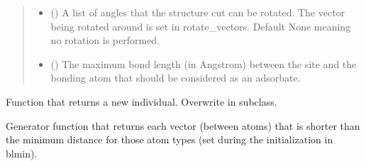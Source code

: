 \documentclass[letterpaper,10pt,english]{sphinxmanual}
\begin{document}
\begin{fulllineitems}
\begin{quote}
\begin{description}
\begin{itemize}
\item {} 
 (\sphinxstyleliteralemphasis{\sphinxupquote{, }}) \textendash{} A list of angles that the structure cut can be rotated. The
vector being rotated around is set in rotate\_vectors. Default
None meaning no rotation is performed.

\item {} 
 (\sphinxstyleliteralemphasis{\sphinxupquote{, }}) \textendash{} The maximum bond length (in Angstrom) between the site and the
bonding atom  that should be considered as an adsorbate.

\end{itemize}

\end{description}\end{quote}

\begin{fulllineitems}
\label{\detokenize{ga:acat.ga.adsorbate_operators.CutSpliceCrossoverWithAdsorbates.get_new_individual}}
Function that returns a new individual.
Overwrite in subclass.

\end{fulllineitems}


\begin{fulllineitems}
\label{\detokenize{ga:acat.ga.adsorbate_operators.CutSpliceCrossoverWithAdsorbates.get_vectors_below_min_dist}}
Generator function that returns each vector (between atoms)
that is shorter than the minimum distance for those atom types
(set during the initialization in blmin).

\end{fulllineitems}


\end{fulllineitems}
\end{document}
